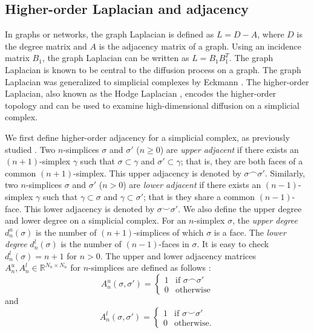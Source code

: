 \documentclass[10pt, letterpaper]{article}
\begin{document}
\subsection{Higher-order Laplacian and adjacency}
In graphs or networks, the graph Laplacian is defined as $L=D-A$, where $D$ is the degree matrix and $A$ is the adjacency matrix of a graph. Using an incidence matrix $B_1$, the graph Laplacian can be written as $L=B_{1}B_{1}^{T}$. The graph Laplacian is known to be central to the diffusion process on a graph. The graph Laplacian was generalized to simplicial complexes by Eckmann \cite{Eckmann1944}. The higher-order Laplacian, also known as the Hodge Laplacian \cite{Lim2020}, encodes the higher-order topology and can be used to examine high-dimensional diffusion on a simplicial complex.

We first define higher-order adjacency for a simplicial complex, as previously studied \cite{Estrada2018, Hernandez2020, Muhammad2006}. Two $n$-simplices $\sigma$ and $\sigma'$ ($n\geq 0$) are \textit{upper adjacent} if there exists an $(n+1)$-simplex $\gamma$ such that $\sigma\subset\gamma$ and $\sigma'\subset\gamma$; that is, they are both faces of a common $(n+1)$-simplex. This upper adjacency is denoted by $\sigma\frown\sigma'$. Similarly, two $n$-simplices $\sigma$ and $\sigma'$ ($n>0$) are \textit{lower adjacent} if there exists an $(n-1)$-simplex $\gamma$ such that $\gamma\subset\sigma$ and $\gamma\subset\sigma'$; that is they share a common $(n-1)$-face. This lower adjacency is denoted by $\sigma\smile\sigma'$. We also define the upper degree and lower degree on a simplicial complex. For an $n$-simplex $\sigma$, the \textit{upper degree} $d^{u}_{n}(\sigma)$ is the number of $(n+1)$-simplices of which $\sigma$ is a face. The \textit{lower degree} $d^{l}_{n}(\sigma)$ is the number of $(n-1)$-faces in $\sigma$. It is easy to check $d^{l}_{n}(\sigma)=n+1$ for $n>0$. The upper and lower adjacency matrices $A^{u}_{n}, A^{l}_{n}\in\mathbb{R}^{N_{n}\times N_{n}}$ for $n$-simplices are defined as follows \cite{Estrada2018}:
 \begin{equation}
A^{u}_{n}(\sigma,\sigma') = \begin{cases}
1 & \text{if } \sigma\frown\sigma' \\
0 & \text{otherwise}
\end{cases}
\end{equation}
and
 \begin{equation}
A^{l}_{n}(\sigma,\sigma') = \begin{cases}
1 & \text{if } \sigma\smile\sigma' \\
0 & \text{otherwise.}
\end{cases}
\end{equation}
\end{document}
